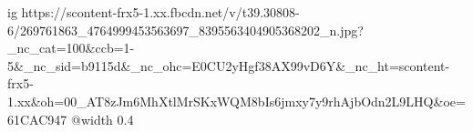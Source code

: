  
 
 
 
 

\ifcmt
  ig https://scontent-frx5-1.xx.fbcdn.net/v/t39.30808-6/269761863_4764999453563697_8395563404905368202_n.jpg?_nc_cat=100&ccb=1-5&_nc_sid=b9115d&_nc_ohc=E0CU2yHgf38AX99vD6Y&_nc_ht=scontent-frx5-1.xx&oh=00_AT8zJm6MhXtlMrSKxWQM8bIs6jmxy7y9rhAjbOdn2L9LHQ&oe=61CAC947
  @width 0.4
\fi
